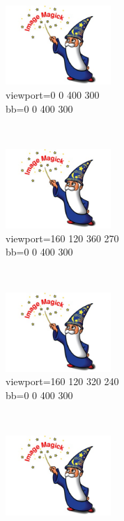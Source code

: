 \begin{figure}[h]
    \centering
    \begin{subfigure}[b]{0.3\textwidth}
        \includegraphics[viewport=0 0 400 300,bb=0 0 400 300,width=4cm,height=3cm,clip=true]{test.jpg}
        \caption{viewport=0 0 400 300\\bb=0 0 400 300}
        \label{essai_a}
    \end{subfigure}
    ~ %
    \begin{subfigure}[b]{0.3\textwidth}
        \includegraphics[viewport=160 120 360 270,bb=0 0 400 300,width=4cm,height=3cm,clip=true]{test.jpg}
        \caption{viewport=160 120 360 270\\bb=0 0 400 300}%
        \label{essai_b}
    \end{subfigure}
    ~
    \begin{subfigure}[b]{0.3\textwidth}
        \includegraphics[viewport=160 120 320 240,bb=0 0 400 300,width=4cm,height=3cm,clip=true]{test.jpg}
        \caption{viewport=160 120 320 240\\bb=0 0 400 300}%
        \label{essai_c}
    \end{subfigure}
    \\
    \begin{subfigure}[b]{0.3\textwidth}
        \includegraphics[viewport=160 120 280 210,bb=0 0 400 300,width=4cm,height=3cm,clip=true]{test.jpg}

\end{subfigure}
\end{figure}
